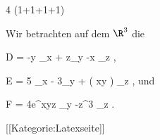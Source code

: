 {4 (1+1+1+1)}
{

Wir betrachten auf dem $\R^3$ die

\mavergleichskettedisp
{\vergleichskette
{ D
}
{ =} { -y \partial_x  + z\partial_y -x \partial_z
}
{ } {
}
{ } {
}
{ } {
}
}
{}{}{,}

\mavergleichskettedisp
{\vergleichskette
{ E
}
{ =} { 5 \partial_x - 3\partial_y +  \cos \left(  xy \right)  \partial_z
}
{ } {
}
{ } {
}
{ } {
}
}
{}{}{,}
und

\mavergleichskettedisp
{\vergleichskette
{ F
}
{ =} { 4e^{xyz} \partial_y -z^3 \partial_z
}
{ } {
}
{ } {
}
{ } {
}
}
{}{}{.}

}
{} {}

 [[Kategorie:Latexseite]]
